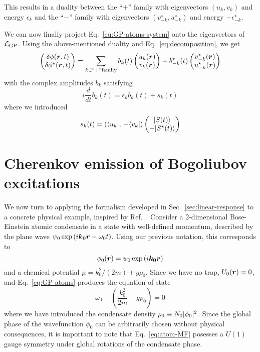 This results in a duality between the ``$+$'' family with eigenvectors
$(u_k, v_k)$ and energy $\epsilon_k$ and the ``$-$'' family with
eigenvectors $(v_{-k}^{\star}, u_{-k}^{\star})$ and energy
$-\epsilon_{-k}^{\star}$.

We can now finally project Eq.~\eqref{eq:GP-atoms-system} onto the
eigenvectors of $\mathcal{L}_{\text{GP}}$. Using the above-mentioned duality and
Eq.~\eqref{eq:decomposition}, we get
%
\begin{equation}\label{eq:phi-column-expansion}
  \begin{pmatrix} \delta\phi(\bm{r},t)\\ \delta\phi^{\star}(\bm{r},t) \end{pmatrix} = \sum_{k \in ``+" \mbox{\scriptsize family}}
  b_k(t) \begin{pmatrix} u_k(\bm{r})\\ v_k(\bm{r}) \end{pmatrix}
  + b_{-k}^{\star}(t) \begin{pmatrix} v_{-k}^{\star}(\bm{r})\\ u_{-k}^{\star}(\bm{r}) \end{pmatrix}
\end{equation}
% 
with the complex amplitudes $b_k$ satisfying 
%
\begin{equation}\label{eq:amplitudes-bk}
  i \frac{d}{dt}b_k(t) = \epsilon_k b_k(t) + s_k(t)
\end{equation}
% 
where we introduced
%
\begin{equation}\label{eq:amplitudes-sk}
  s_k(t) = \left( \langle u_k \vert ,\, -\langle v_k \vert \right) \begin{pmatrix} \vert S(t) \rangle\\ -\vert S^{\star}(t) \rangle \end{pmatrix}
\end{equation}
% 

\section{Cherenkov emission of Bogoliubov excitations}
\label{sec:cherenkov-emission}


We now turn to applying the formalism developed in
Sec.~\ref{sec:linear-response} to a concrete physical example,
inspired by Ref.~\cite{Carusotto_2006}. Consider a 2-dimensional
Bose-Einstein atomic condensate in a state with well-defined momentum,
described by the plane wave
$\psi_0 \exp \left( i \bm{k_0} \bm{r} - \omega_0 t \right)$. Using our
previous notation, this corresponds to
%
\begin{equation}\label{eq:atom-initial}
  \phi_0(\bm{r}) = \psi_0 \exp \left( i \bm{k_0} \bm{r} \right)
\end{equation}
% 
and a chemical potential $\mu = k_0^2/(2m) + g \rho_0$. Since we have
no trap, $U_0(\bm{r})=0$, and Eq.~\eqref{eq:GP-atoms} produces the
equation of state
%
\begin{equation}\label{eq:atom-MF}
  \omega_0 - \left( \frac{k_0^2}{2m} + g \rho_0 \right) = 0
\end{equation}
% 
where we have introduced the condensate density
$\rho_0 \equiv N_0 \vert \phi_0 \vert^2$. Since the global phase of the
wavefunction $\phi_0$ can be arbitrarily chosen without physical
consequences, it is important to note that Eq.~\eqref{eq:atom-MF}
posesses a $U(1)$ gauge symmetry under global rotations of the
condensate phase.

